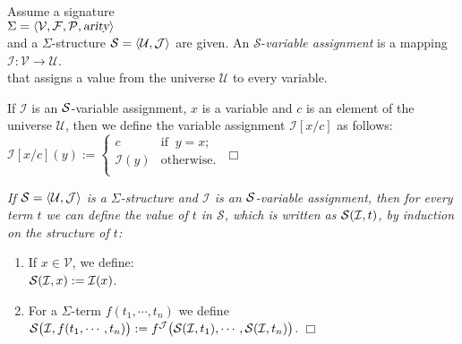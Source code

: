 \begin{Definition}
Assume a signature
\\[0.2cm]
\hspace*{1.3cm} 
$\Sigma = \langle \mathcal{V}, \mathcal{F}, \mathcal{P}, \textsl{arity} \rangle$ 
\\[0.2cm]
and a $\Sigma$-structure   $\mathcal{S} = \langle \mathcal{U}, \mathcal{J} \rangle$  are given.  An 
$\mathcal{S}$-\emph{variable assignment} is a mapping 
\\[0.2cm]
\hspace*{1.3cm} 
$\mathcal{I}: \mathcal{V} \rightarrow \mathcal{U}$.
\\[0.2cm]
that assigns a value from the universe $\mathcal{U}$ to every variable.


If $\mathcal{I}$ is an  $\mathcal{S}$-variable assignment, $x$ is a variable and $c$ is an element
of the universe $\mathcal{U}$, then we define the variable assignment
$\mathcal{I}[x/c]$ as follows:
\\[0.2cm]
\hspace*{1.3cm} 
$\mathcal{I}[x/c](y) := \left\{
\begin{array}{ll}
c               & \mbox{if}\;\; y = x;  \\
\mathcal{I}(y)  & \mbox{otherwise}.          \\
\end{array}
\right.$ \hspace*{\fill} $\Box$
\end{Definition}

\begin{Definition}
{\em
    If $\struct = \pair(\mathcal{U},\mathcal{J})$ is a $\Sigma$-structure and $\mathcal{I}$ is an 
    $\mathcal{S}$-variable assignment, then for every term $t$ we can define the value of 
    $t$ in $\mathcal{S}$, which is written as $\mathcal{S}(\mathcal{I}, t)$,  by induction on the structure of $t$:
    \begin{enumerate}
    \item If  $x \in \mathcal{V}$, we define: \\[0.2cm]
          \hspace*{1.3cm} 
          $\mathcal{S}(\mathcal{I}, x) := \mathcal{I}(x)$.
    \item For a $\Sigma$-term $f(t_1,\cdots,t_n)$ we define \\[0.2cm]
          \hspace*{1.3cm} 
          $\mathcal{S}\bigl(\mathcal{I}, f(t_1,\cdots,t_n)\bigr) := 
           f^\mathcal{J}\bigl( \mathcal{S}(\mathcal{I}, t_1), \cdots, \mathcal{S}(\mathcal{I}, t_n) \bigr)
          $.
          \hspace*{\fill} $\Box$
    \end{enumerate}
}
\end{Definition}

